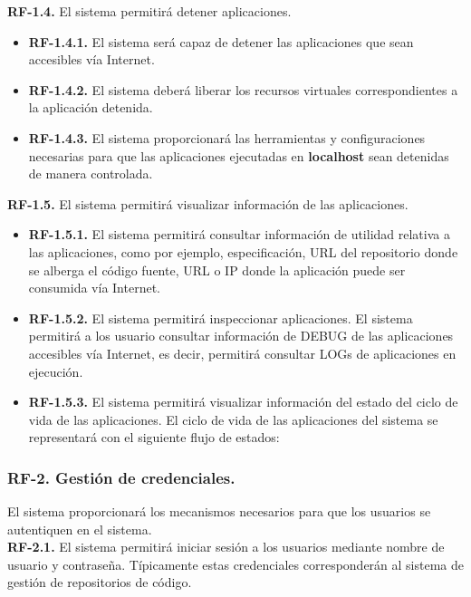 \documentclass[a4paper,11pt]{book}
\begin{document}
	
\textbf{RF-1.4.} El sistema permitirá detener aplicaciones.

\begin{itemize}
 \item  \textbf{RF-1.4.1.} El sistema será capaz de detener las aplicaciones que sean accesibles vía Internet. 
  \item  \textbf{RF-1.4.2.} El sistema deberá liberar los recursos virtuales correspondientes a la aplicación detenida.  
  \item  \textbf{RF-1.4.3.} El sistema proporcionará las herramientas  y configuraciones necesarias para que las aplicaciones ejecutadas en \textbf{localhost}  sean detenidas de manera controlada. \\
\end{itemize}
	
\textbf{RF-1.5.} El sistema permitirá visualizar información de las aplicaciones.

\begin{itemize}
\item \textbf{RF-1.5.1.} El sistema permitirá consultar  información de utilidad relativa a las aplicaciones,  como por ejemplo, especificación, URL del repositorio donde se alberga el código fuente, URL o IP donde la aplicación puede ser consumida vía Internet. 
\item \textbf{RF-1.5.2.} El sistema permitirá inspeccionar aplicaciones. El sistema permitirá a los usuario consultar información de DEBUG de las aplicaciones accesibles vía Internet, es decir, permitirá consultar LOGs de aplicaciones en ejecución. 
\item \textbf{RF-1.5.3.} El sistema permitirá visualizar información del estado del ciclo de vida de las aplicaciones. El ciclo de vida de las aplicaciones del sistema se representará con el siguiente flujo de estados:\\
\end{itemize}
	

\subsubsection { \textbf{ RF-2. Gestión de credenciales.}} El sistema proporcionará los mecanismos necesarios para que los usuarios se autentiquen en el sistema. \\
	
			
\textbf{RF-2.1.} El sistema  permitirá iniciar sesión  a los usuarios mediante nombre de usuario y contraseña. Típicamente estas credenciales corresponderán al sistema de gestión de repositorios de código. 
\end{document}
